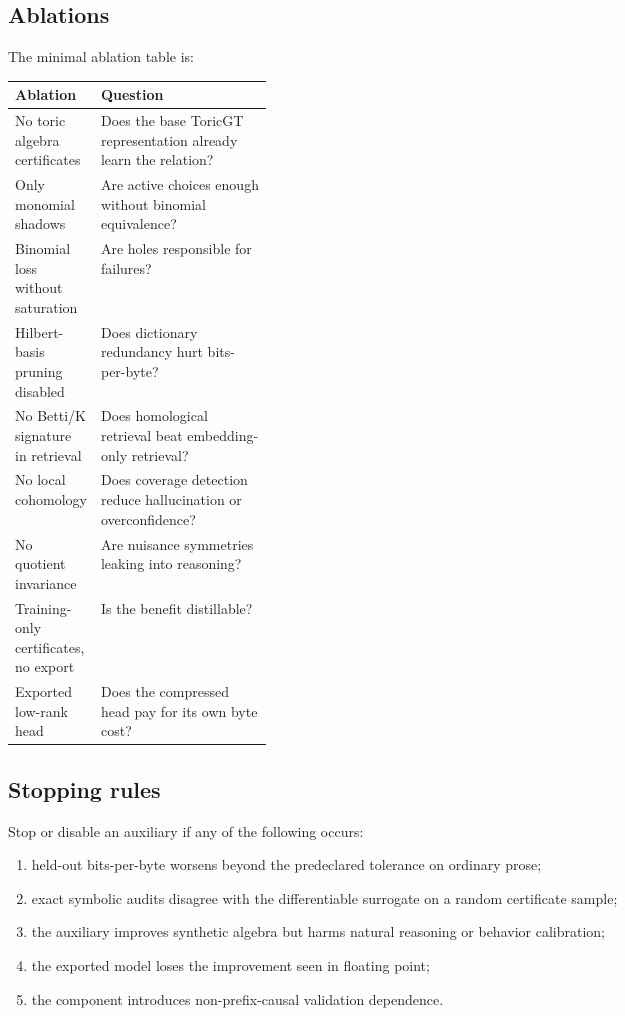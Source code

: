 \documentclass[11pt]{article}
\theoremstyle{definition}
\begin{document}
\subsection{Ablations}
The minimal ablation table is:
\begin{center}
\begin{tabularx}{\linewidth}{p{0.30\linewidth}X}
\toprule
Ablation & Question \\
\midrule
No toric algebra certificates & Does the base ToricGT representation already learn the relation? \\
Only monomial shadows & Are active choices enough without binomial equivalence? \\
Binomial loss without saturation & Are holes responsible for failures? \\
Hilbert-basis pruning disabled & Does dictionary redundancy hurt bits-per-byte? \\
No Betti/K signature in retrieval & Does homological retrieval beat embedding-only retrieval? \\
No local cohomology & Does coverage detection reduce hallucination or overconfidence? \\
No quotient invariance & Are nuisance symmetries leaking into reasoning? \\
Training-only certificates, no export & Is the benefit distillable? \\
Exported low-rank head & Does the compressed head pay for its own byte cost? \\
\bottomrule
\end{tabularx}
\end{center}

\subsection{Stopping rules}
Stop or disable an auxiliary if any of the following occurs:
\begin{enumerate}[leftmargin=*]
\item held-out bits-per-byte worsens beyond the predeclared tolerance on ordinary prose;
\item exact symbolic audits disagree with the differentiable surrogate on a random certificate sample;
\item the auxiliary improves synthetic algebra but harms natural reasoning or behavior calibration;
\item the exported model loses the improvement seen in floating point;
\item the component introduces non-prefix-causal validation dependence.
\end{enumerate}
\end{document}
